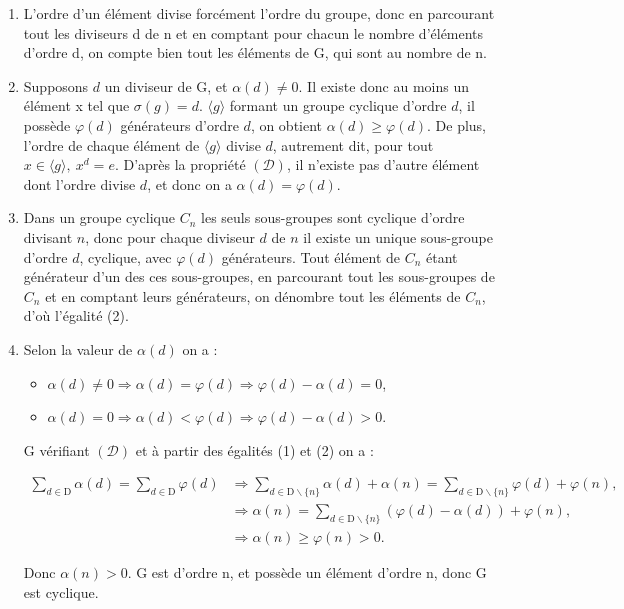 
\begin{enumerate}[label=\alph*)]
    \item L'ordre d'un élément divise forcément l'ordre du groupe, donc en parcourant tout les diviseurs d de n et en comptant pour chacun le nombre d'éléments d'ordre d, on compte bien tout les éléments de G, qui sont au nombre de n.
    \item Supposons $d$ un diviseur de G, et $\alpha(d)\neq 0$. Il existe donc au moins un élément x tel que $\sigma(g) = d$. $\langle g \rangle$ formant un groupe cyclique d'ordre $d$, il possède $\varphi(d)$ générateurs d'ordre $d$, on obtient $\alpha(d) \geq \varphi(d)$. De plus, l'ordre de chaque élément de $\langle g \rangle$ divise $d$, autrement dit, pour tout $x \in \langle g \rangle,\ x^d = e$. D'après la propriété $( \mathcal{D})$, il n'existe pas d'autre élément dont l'ordre divise $d$, et donc on a $\alpha(d) = \varphi(d)$.
    \item Dans un groupe cyclique $C_n$ les seuls sous-groupes sont cyclique d'ordre divisant $n$, donc pour chaque diviseur $d$ de $n$ il existe un unique sous-groupe d'ordre $d$, cyclique, avec $\varphi(d)$ générateurs. Tout élément de $C_n$ étant générateur d'un des ces sous-groupes, en parcourant tout les sous-groupes de $C_n$ et en comptant leurs générateurs, on dénombre tout les éléments de $C_n$, d'où l'égalité (2).
    \item Selon la valeur de $\alpha(d)$ on a :
    \begin{itemize}
        \item $\alpha(d)\neq 0 \Rightarrow \alpha(d)=\varphi(d) \Rightarrow \varphi(d) - \alpha(d) = 0$,
        \item $\alpha(d) = 0 \Rightarrow \alpha(d)<\varphi(d) \Rightarrow \varphi(d)-\alpha(d) > 0$.
    \end{itemize}
    G vérifiant $(\mathcal{D})$ et à partir des égalités (1) et (2) on a :
    
    \begin{align*}
        \sum_{d \in \text{D}} \alpha(d) =  \sum_{d \in \text{D}} \varphi(d) &\Rightarrow  \sum_{d \in \text{D} \backslash \{ n \} } \alpha(d) + \alpha(n) =  \sum_{d \in \text{D} \backslash \{n\}} \varphi(d) + \varphi(n), \\
        &\Rightarrow \alpha(n)=  \sum_{d \in \text{D} \backslash \{n\}} \left( \varphi(d) - \alpha(d) \right) + \varphi(n), \\
        &\Rightarrow \alpha(n) \geq \varphi(n) > 0.
    \end{align*}

    Donc $\alpha(n)>0$. G est d'ordre n, et possède un élément d'ordre n, donc G est cyclique.
\end{enumerate}